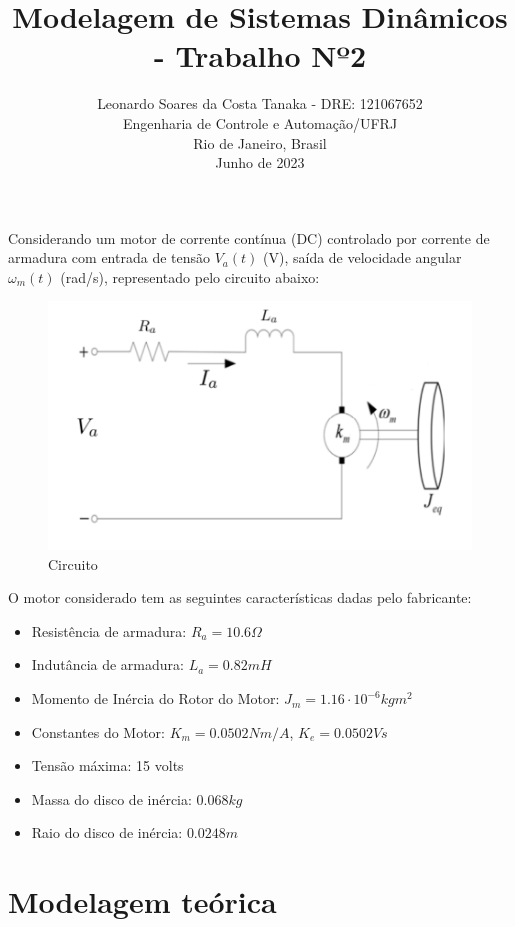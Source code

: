 \documentclass[10pt]{article}
\title{Modelagem de Sistemas Dinâmicos - Trabalho Nº2}
\author{
    Leonardo Soares da Costa Tanaka - DRE: 121067652 \\
    Engenharia de Controle e Automação/UFRJ \\
    Rio de Janeiro, Brasil \\
    Junho de 2023
}
\date{}
\begin{document}
\maketitle
\thispagestyle{capa}

\quad Considerando um motor de corrente contínua (DC) controlado por corrente de armadura
com entrada de tensão $V_a(t)$ (V), saída de velocidade angular $\omega_m(t)$ (rad/s),
representado pelo circuito abaixo:

\begin{figure}[h]
    \centering
    \includegraphics[scale=0.3]{circuito.png}
    \caption{Circuito}
\end{figure}

\quad O motor considerado tem as seguintes características dadas pelo fabricante:

\begin{itemize}[label={\textbullet}]
    \item Resistência de armadura: $R_a = 10.6 \Omega$
    \item Indutância de armadura: $L_a = 0.82 mH$
    \item Momento de Inércia do Rotor do Motor: $J_m = 1.16 \cdot  10^{-6} kgm^2$
    \item Constantes do Motor: $K_m = 0.0502 Nm/A$, $K_e = 0.0502 V s$
    \item Tensão máxima: 15 volts
    \item Massa do disco de inércia: $0.068 kg$
    \item Raio do disco de inércia: $0.0248 m$
\end{itemize}

\section{Modelagem teórica}
\end{document}
